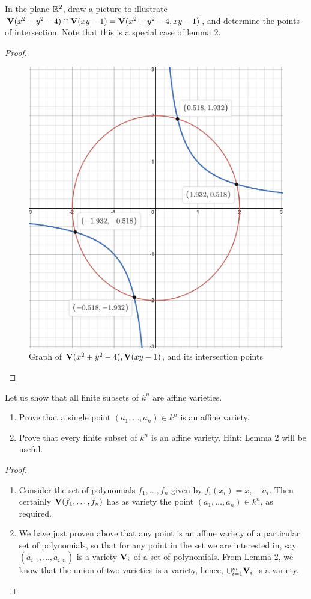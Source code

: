 \begin{exercise}{3}
In the plane $\mathbb{R}^2$, draw a picture to illustrate $\mathbf{V}(x^2+y^2-4)\cap\mathbf{V}(xy-1)=\mathbf{V}(x^2+y^2-4,xy-1)$, and determine the points of intersection. Note that this is a special case of lemma 2.
\end{exercise}
\begin{proof}
 \begin{figure}[H]
     \centering
     \includegraphics[width=.5\textwidth]{cox-little-oshea/assets/sec1-2-ex3.png}
     \caption{Graph of $\mathbf{V}(x^2+y^2-4), \mathbf{V}(xy-1)$, and its intersection points}
     \label{fig:sec1-2-ex3}
 \end{figure}
\end{proof}

\begin{exercise}{6}
Let us show that all finite subsets of $k^n$ are affine varieties.

\begin{enumerate}
    \item Prove that a single point $(a_1,\dots,a_n)\in k^n$ is an affine variety.
    \item Prove that every finite subset of $k^n$ is an affine variety. Hint: Lemma 2 will be useful.
\end{enumerate}
\end{exercise}
\begin{proof}
 \begin{enumerate}
     \item Consider the set of polynomials $f_1,\dots,f_n$ given by $f_i(x_i)=x_i-a_i$. Then certainly $\mathbf{V}(f_1,\dots,f_n)$ has as variety the point $(a_1,\dots,a_n)\in k^n$, as required.
     \item We have just proven above that any point is an affine variety of a particular set of polynomials, so that for any point in the set we are interested in, say $(a_{i,1},\dots,a_{i,n})$ is a variety $\mathbf{V}_i$ of a set of polynomials. From Lemma 2, we know that the union of two varieties is a variety, hence, $\cup_{i=1}^{m}\mathbf{V}_i$ is a variety.
 \end{enumerate}
\end{proof}

